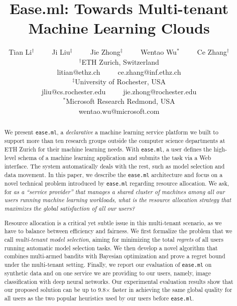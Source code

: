 \documentclass[letterpaper]{vldb}
\newcommand{\eml}{\texttt{ease.ml}\xspace}
\begin{document}


\title{Ease.ml: Towards Multi-tenant Machine Learning Clouds}

\author{
Tian Li$^\dagger$~~~~~Ji Liu$^\ddagger$~~~~~Jie Zhong$^\ddagger$~~~~~Wentao Wu$^*$~~~~~Ce Zhang$^\dagger$\\
\small $^\dagger$ETH Zurich, Switzerland\\
\small litian@ethz.ch~~~~~ce.zhang@inf.ethz.ch\\
\small $^\ddagger$University of Rochester, USA\\
\small jliu@cs.rochester.edu~~~~~jie.zhong@rochester.edu\\
\small $^*$Microsoft Research Redmond, USA\\
\small wentao.wu@microsoft.com
}

\maketitle

\begin{abstract}
We present \eml, a \emph{declarative} a machine learning service platform we built
to support more than ten research groups outside the computer science departments at ETH Zurich 
for their machine learning needs.
With \eml, a user defines the high-level 
schema of a machine learning application and submits
the task via a Web interface. The system automatically deals with the rest, such as model selection and data movement.
In this paper, we describe the \eml architecture and focus on
a novel technical problem introduced by \eml regarding resource allocation.
We ask, {for \em as a ``service provider'' that manages a shared cluster of 
machines among all our users running machine learning workloads, what is the resource
allocation strategy that maximizes the global satisfaction of all
our users?}


Resource allocation is a critical yet subtle issue in this multi-tenant scenario, as we 
have to balance between efficiency and fairness.
We first formalize the problem that we call {\em multi-tenant model selection}, 
aiming for minimizing the total {\em regrets} of all users
running automatic model selection tasks.
We then develop a novel algorithm that combines multi-armed bandits with Bayesian 
optimization and prove a regret bound 
under the multi-tenant setting.
Finally, we report our evaluation of \eml on synthetic data and on one service 
we are providing to our users, namely, 
image classification with deep neural networks.
Our experimental evaluation results show that our proposed solution can 
be up to 9.8$\times$ faster in achieving the same global quality
for all users as the %
two popular heuristics used by our users before \eml.

\end{abstract} 
\end{document}
